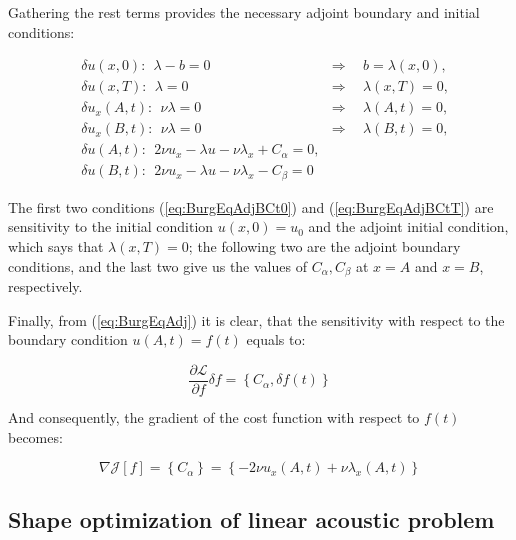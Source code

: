 Gathering the rest terms provides the necessary adjoint boundary and initial conditions:

\begin{subequations}
\begin{align}
    \label{eq:BurgEqAdjBCt0}
    & \delta u(x,0): \ \ \lambda - b = 0 & \Rightarrow \ \ & b = \lambda(x,0),\\
    \label{eq:BurgEqAdjBCtT}
    & \delta u(x,T): \ \ \lambda = 0 & \Rightarrow \ \ & \lambda(x,T) = 0 ,\\
    & \delta u_x(A,t): \ \ \nu \lambda = 0 & \Rightarrow \ \ & \lambda(A,t) = 0, \\
    & \delta u_x(B,t): \ \ \nu \lambda = 0 & \Rightarrow \ \ & \lambda(B,t) = 0, \\
    & \delta u(A,t): \ \ 2 \nu u_x - \lambda u - \nu \lambda_x + C_{\alpha} = 0, \\
    & \delta u(B,t): \ \ 2 \nu u_x - \lambda u - \nu \lambda_x - C_{\beta} = 0
\end{align}
\end{subequations}

The first two conditions (\ref{eq:BurgEqAdjBCt0}) and (\ref{eq:BurgEqAdjBCtT}) are sensitivity to the initial condition $u(x,0) = u_0$ and the adjoint initial condition, which says that $\lambda(x,T) = 0$; the following two are the adjoint boundary conditions, and the last two give us the values of $C_{\alpha}, C_{\beta}$ at $x = A$ and $x = B$, respectively.

Finally, from (\ref{eq:BurgEqAdj}) it is clear, that the sensitivity with respect to the boundary condition $u(A,t) = f(t)$ equals to:

\begin{equation}
\frac{\partial \mathcal{L}}{\partial f} \delta f = \left\{C_{\alpha} , \delta f(t)  \right\}
\end{equation}

And consequently, the gradient of the cost function with respect to $f(t)$ becomes:

\begin{equation}
\nabla \mathcal{J}[f] = \left\{ C_{\alpha} \right\} = \left\{ -2 \nu u_x (A,t) + \nu \lambda_x (A,t) \right\}
\end{equation}

\subsection{Shape optimization of linear acoustic problem}

